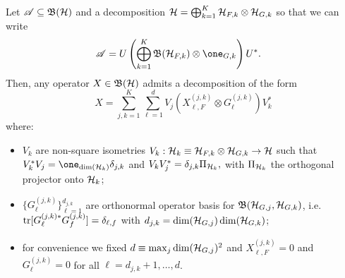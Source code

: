 \documentclass[aihp,12pt]{imsart}
\begin{document}
\begin{lemma}
    Let $\mathscr{A}\subseteq\mathfrak{B}(\mathcal{H})$ and a decomposition
    \(\mathcal{H} = \bigoplus_{k=1}^K \mathcal{H}_{F,k}\otimes\mathcal{H}_{G,k} \)
so that we can write
\begin{align*}
    \As &= U\left(\bigoplus_{k=1}^K \Bf(\Hc_{F,k}) \otimes \one_{G,k}\right)U^*.
\end{align*}
    Then, any operator $X\in\mathfrak{B}(\mathcal{H})$ admits a decomposition of the form \[X =\sum_{j,k=1}^K \sum_{\ell=1}^{d} V_j (X_{\ell,F}^{(j,k)}\otimes G_{\ell}^{(j,k)}) V_k^*\]
    where: \begin{itemize}
        \item $V_k$ are non-square isometries $V_k:\mathcal{H}_k\equiv\mathcal{H}_{F,k}\otimes\mathcal{H}_{G,k}\to \mathcal{H}$ such that $V_k^* V_j = \one_{\dim(\Hc_k)} \delta_{j,k}$ and $V_kV_j^* = \delta_{j,k}\Pi_{\mathcal{H}_k},$ with $\Pi_{\mathcal{H}_k}$ the orthogonal projector onto $\mathcal{H}_k$;
        \item $\{G_{\ell}^{(j,k)}\}_{\ell=1}^{d_{j,k}}$ are orthonormal operator basis for $\mathfrak{B}(\mathcal{H}_{G,j},\mathcal{H}_{G,k})$, i.e. ${\rm tr}[G_\ell^{(j,k)*} G_f^{(j,k)}] = \delta_{\ell,f}$ with $d_{j,k}= \dim(\mathcal{H}_{G,j})\dim(\mathcal{H}_{G,k})$;
        \item for convenience we fixed $d\equiv\max_{j} \dim(\mathcal{H}_{G,j})^2$ and $X_{\ell,F}^{(j,k)} = 0$ and $G_{\ell}^{(j,k)}=0$ for all $\ell = d_{j,k}+1,\dots, d$. 
    \end{itemize} 
\end{lemma}
\end{document}
